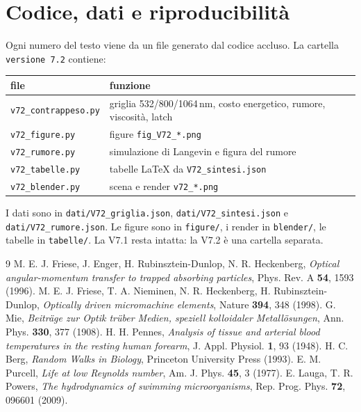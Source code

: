 \documentclass[11pt,a4paper]{article}
\begin{document}
\section*{Codice, dati e riproducibilità}

Ogni numero del testo viene da un file generato dal codice accluso. La
cartella \texttt{versione 7.2} contiene:

\begin{center}\small
\begin{tabular}{p{3.6cm}p{10.0cm}}
\hline
file & funzione \\
\hline
\texttt{v72\_contrappeso.py} & griglia 532/800/1064\,nm, costo energetico,
rumore, viscosità, latch \\
\texttt{v72\_figure.py} & figure \texttt{fig\_V72\_*.png} \\
\texttt{v72\_rumore.py} & simulazione di Langevin e figura del rumore \\
\texttt{v72\_tabelle.py} & tabelle LaTeX da \texttt{V72\_sintesi.json} \\
\texttt{v72\_blender.py} & scena e render \texttt{v72\_*.png} \\
\hline
\end{tabular}
\end{center}

I dati sono in \texttt{dati/V72\_griglia.json},
\texttt{dati/V72\_sintesi.json} e \texttt{dati/V72\_rumore.json}. Le figure
sono in \texttt{figure/}, i render in \texttt{blender/}, le tabelle in
\texttt{tabelle/}. La V7.1 resta intatta: la V7.2 è una cartella separata.

\begin{thebibliography}{9}\small
{} M. E. J. Friese, J. Enger, H. Rubinsztein-Dunlop,
N. R. Heckenberg, \emph{Optical angular-momentum transfer to trapped
absorbing particles}, Phys. Rev. A \textbf{54}, 1593 (1996).
 M. E. J. Friese, T. A. Nieminen, N. R. Heckenberg,
H. Rubinsztein-Dunlop, \emph{Optically driven micromachine elements},
Nature \textbf{394}, 348 (1998).
 G. Mie, \emph{Beiträge zur Optik trüber Medien, speziell
kolloidaler Metallösungen}, Ann. Phys. \textbf{330}, 377 (1908).
 H. H. Pennes, \emph{Analysis of tissue and arterial
blood temperatures in the resting human forearm}, J. Appl. Physiol.
\textbf{1}, 93 (1948).
 H. C. Berg, \emph{Random Walks in Biology}, Princeton
University Press (1993).
 E. M. Purcell, \emph{Life at low Reynolds number},
Am. J. Phys. \textbf{45}, 3 (1977).
 E. Lauga, T. R. Powers, \emph{The hydrodynamics of
swimming microorganisms}, Rep. Prog. Phys. \textbf{72}, 096601 (2009).
\end{thebibliography}
\end{document}
